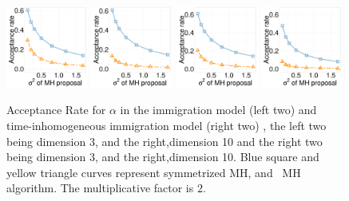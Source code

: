   \begin{figure}[H]
  \centering
  \begin{minipage}[!hp]{0.99\linewidth}
    \includegraphics [width=0.24\textwidth, angle=0]{figs/acc/Q_D3alpha_k2.pdf}
    \includegraphics [width=0.24\textwidth, angle=0]{figs/acc/Q_D10alpha_k2.pdf}
    \includegraphics [width=0.24\textwidth, angle=0]{figs/acc/CQ_D3alpha_k2.pdf}
    \includegraphics [width=0.24\textwidth, angle=0]{figs/acc/CQ_D10alpha_k2.pdf}
  \end{minipage}
    \caption{Acceptance Rate for $\alpha$ in the immigration model (left two) and time-inhomogeneous immigration model (right two) , the left two being dimension 3, and the right,dimension 10 and the right two being dimension 3, and the right,dimension 10.  Blue square and yellow triangle curves represent symmetrized MH,
 and \naive\ MH  algorithm. The multiplicative factor is $2$. }
     \label{fig:ACC_Q}
  \end{figure}


